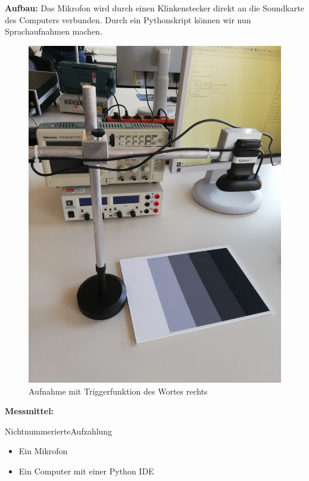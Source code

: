 \documentclass[12pt, oneside, a4paper, \docLanguage]{report}
\begin{document}
\newline
\newline
\textbf{Aufbau:}
\newline
Das Mikrofon wird durch einen Klinkenstecker direkt an die Soundkarte des Computers verbunden.
Durch ein Pythonskript können wir nun Sprachaufnahmen machen.
\begin{figure}[H]
	\centering
	\includegraphics[width=.5\linewidth]{media/aufbau.jpg}
	\caption{Aufnahme mit Triggerfunktion des Wortes rechts}
	\label{img:Aufnahme mit Triggerfunktion des Wortes rechts}
\end{figure}
\newpage
\textbf{Messmittel:}
\item[NichtnummerierteAufzahlung]~\par
   \begin{itemize}
      \item Ein Mikrofon
      \item Ein Computer mit einer Python IDE
   \end{itemize}
\newpage
\end{document}
